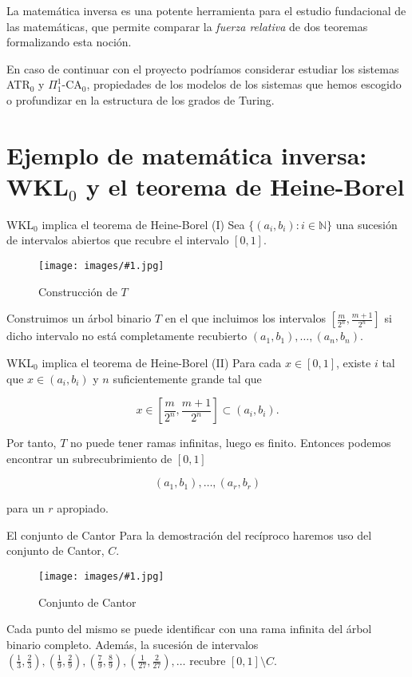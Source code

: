 \documentclass[10pt]{beamer}
\newcommand{\ffigure}[2]{
  \begin{figure}[h!]
    \centering
    \texttt{[image: images/\#1.jpg]}
    \caption{#2}
    \label{fig:#1}
  \end{figure}
}
\begin{document}
\begin{frame}[fragile]
  La matemática inversa es una potente herramienta para el estudio fundacional de las matemáticas, que permite comparar la \textit{fuerza relativa} de dos teoremas formalizando esta noción.

  \vfill

  En caso de continuar con el proyecto podríamos considerar estudiar los sistemas ATR$_0$ y $\Pi_1^1$-CA$_0$, propiedades de los modelos de los sistemas que hemos escogido o profundizar en la estructura de los grados de Turing.
\end{frame}

\section{Ejemplo de matemática inversa: WKL$_0$ y el teorema de Heine-Borel}

\begin{frame}[fragile]{WKL$_0$ implica el teorema de Heine-Borel (I)}
  Sea $\{(a_i, b_i): i \in \mathbb{N}\}$ una sucesión de intervalos abiertos que recubre el intervalo $[0, 1]$.

  \ffigure{non-covered-intervals}{Construcción de $T$}

  Construimos un árbol binario $T$ en el que incluimos los intervalos $[\frac{m}{2^n}, \frac{m + 1}{2^n}]$ si dicho intervalo no está completamente recubierto $(a_1, b_1), \ldots, (a_n, b_n)$.
\end{frame}

\begin{frame}[fragile]{WKL$_0$ implica el teorema de Heine-Borel (II)}
  Para cada $x \in [0, 1]$, existe $i$ tal que $x \in (a_i, b_i)$ y $n$ suficientemente grande tal que

  \[ x \in \left[\frac{m}{2^n}, \frac{m + 1}{2^n}\right] \subset (a_i, b_i). \]

  Por tanto, $T$ no puede tener ramas infinitas, luego es finito. Entonces podemos encontrar un subrecubrimiento de $[0, 1]$

  \[ (a_1, b_1), \ldots, (a_r, b_r) \]

  para un $r$ apropiado.
\end{frame}

\begin{frame}[fragile]{El conjunto de Cantor}
  Para la demostración del recíproco haremos uso del conjunto de Cantor, $C$.

  \ffigure{cantor-set}{Conjunto de Cantor}

  Cada punto del mismo se puede identificar con una rama infinita del árbol binario completo.
  Además, la sucesión de intervalos $(\frac13, \frac23), (\frac19, \frac29), (\frac79, \frac89), (\frac{1}{27}, \frac{2}{27}), \ldots$ recubre $[0, 1] \setminus C$.

\end{frame}
\end{document}

